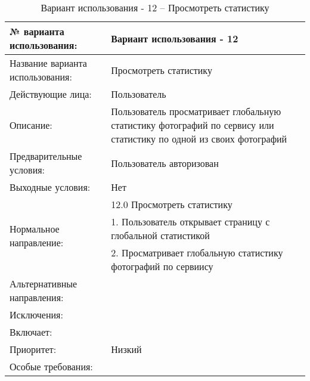 \begin{table}[H]
  \caption{Вариант использования - 12 – Просмотреть статистику}\label{use-case-12-table}
  \begin{tabular}{|p{6cm}|p{10cm}|}
  \hline № варианта использования: & Вариант использования - 12 \\
  \hline Название варианта использования: & Просмотреть статистику \\
  \hline Действующие лица: & Пользователь \\
  \hline Описание: & Пользователь просматривает глобальную статистику фотографий по сервису или статистику по одной из своих фотографий \\
  \hline Предварительные условия: & Пользователь авторизован \\
  \hline Выходные условия: & Нет \\
  \hline \multirow{3}{*}{Нормальное направление:} & 12.0 Просмотреть статистику \\
  \cline{2-2} & 1. Пользователь открывает страницу с глобальной статистикой \\
  \cline{2-2} & 2. Просматривает глобальную статистику фотографий по сервиису \\
  \hline Альтернативные направления: &  \\
  \hline Исключения: &  \\
  \hline Включает: &  \\
  \hline Приоритет: & Низкий \\
  \hline Особые требования: &  \\
  \hline 
  \end{tabular}
\end{table}

